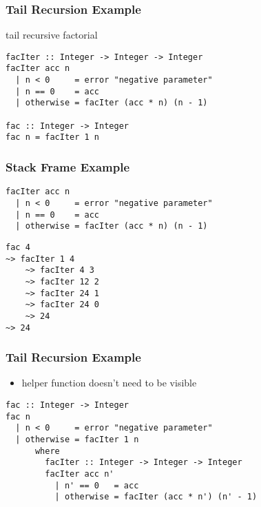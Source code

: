 \documentclass[dvipsnames]{beamer}
\theoremstyle{plain}
\begin{document}
\begin{frame}[fragile]
  \frametitle{Tail Recursion Example}

  \begin{exampleblock}{tail recursive factorial}
    \begin{lstlisting}
facIter :: Integer -> Integer -> Integer
facIter acc n
  | n < 0     = error "negative parameter"
  | n == 0    = acc
  | otherwise = facIter (acc * n) (n - 1)

fac :: Integer -> Integer
fac n = facIter 1 n
    \end{lstlisting}
  \end{exampleblock}
\end{frame}

\begin{frame}[fragile]
  \frametitle{Stack Frame Example}

  \begin{lstlisting}
facIter acc n
  | n < 0     = error "negative parameter"
  | n == 0    = acc
  | otherwise = facIter (acc * n) (n - 1)
  \end{lstlisting}

  \lstinline|fac 4|\\
  \lstinline|~> facIter 1 4|\\
  \lstinline|    ~> facIter 4 3|\\
  \lstinline|    ~> facIter 12 2|\\
  \lstinline|    ~> facIter 24 1|\\
  \lstinline|    ~> facIter 24 0|\\
  \lstinline|    ~> 24|\\
  \lstinline|~> 24|\\
\end{frame}

\begin{frame}[fragile]
  \frametitle{Tail Recursion Example}

  \begin{itemize}
    \item helper function doesn't need to be visible
  \end{itemize}

  \begin{lstlisting}
fac :: Integer -> Integer
fac n
  | n < 0     = error "negative parameter"
  | otherwise = facIter 1 n
      where
        facIter :: Integer -> Integer -> Integer
        facIter acc n'
          | n' == 0   = acc
          | otherwise = facIter (acc * n') (n' - 1)
  \end{lstlisting}
\end{frame}
\end{document}
